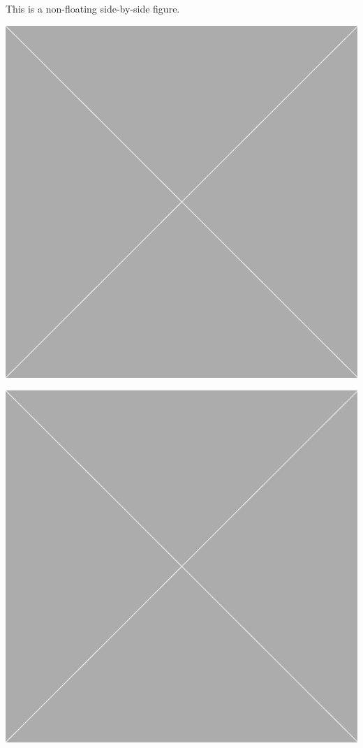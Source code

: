 \documentclass[10pt,oneside]{book}
\begin{document}
\noindent
\begin{minipage}{\textwidth}
  This is a non-floating side-by-side figure.

\flushleft
\begin{minipage}{.48\linewidth}
  \centering
  \includegraphics[width=1.0\linewidth]{Pictures/placeholder.jpg}
  \label{fig:graph1}
\end{minipage}%
\quad
\begin{minipage}{.48\linewidth}
  \centering
  \includegraphics[width=1.0\linewidth]{Pictures/placeholder.jpg}
  \label{fig:graph2}
\end{minipage}
\end{minipage}
\end{document}
